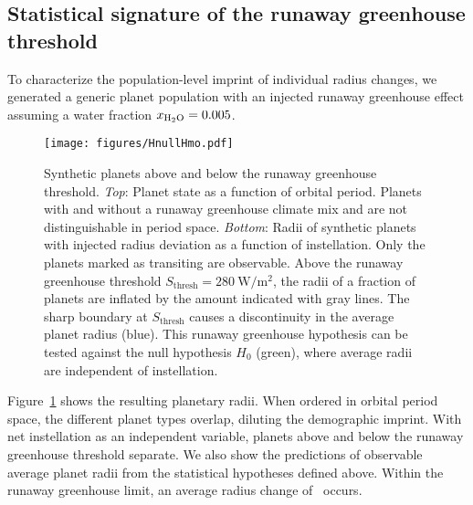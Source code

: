\documentclass[twocolumn]{aastex631}
\begin{document}
\subsection{Statistical signature of the runaway greenhouse threshold}
To characterize the population-level imprint of individual radius changes, we generated a generic planet population with an injected runaway greenhouse effect assuming a water fraction $x_\mathrm{H_2O} = 0.005$.
\begin{figure}
    \begin{centering}
        \texttt{[image: figures/HnullHmo.pdf]}
        \caption{Synthetic planets above and below the runaway greenhouse threshold.
        \textit{Top}: Planet state as a function of orbital period. Planets with and without a runaway greenhouse climate mix and are not distinguishable in period space.
        \textit{Bottom}: Radii of synthetic planets with injected radius deviation as a function of instellation. Only the planets marked as transiting are observable. Above the runaway greenhouse threshold $S_\mathrm{thresh} =\SI{280}{\watt\per\meter\squared} $, the radii of a fraction of planets are inflated by the amount indicated with gray lines. The sharp boundary at $S_\mathrm{thresh}$ causes a discontinuity in the average planet radius (blue). This runaway greenhouse hypothesis can be tested against the null hypothesis $H_0$ (green), where average radii are independent of instellation.}
        \label{fig:HnullHmo}
    \end{centering}
\end{figure}
Figure~\ref{fig:HnullHmo} shows the resulting planetary radii.
When ordered in orbital period space, the different planet types overlap, diluting the demographic imprint.
With net instellation as an independent variable, planets above and below the runaway greenhouse threshold separate.
We also show the predictions of observable average planet radii from the statistical hypotheses defined above.
Within the runaway greenhouse limit, an average radius change of \avgRadiusChange\ occurs.
\end{document}
